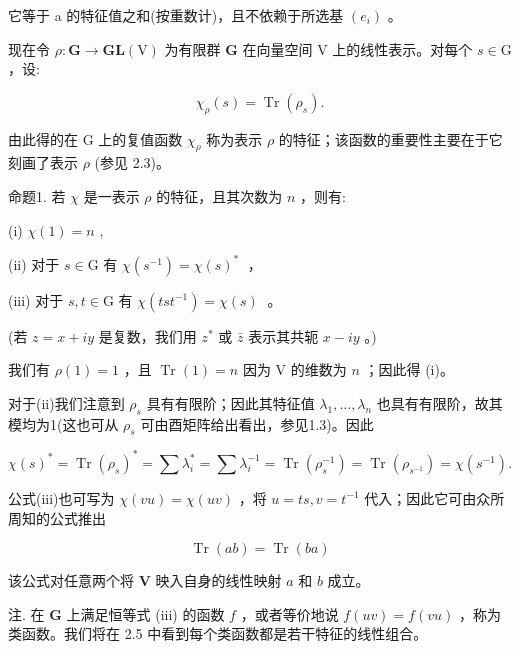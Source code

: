 \documentclass[10pt]{article}
\begin{document}
它等于 a 的特征值之和(按重数计)，且不依赖于所选基 \(\left( {e}_{i}\right)\) 。

现在令 \(\rho  : \mathbf{G} \rightarrow  \mathbf{{GL}}\left( \mathrm{V}\right)\) 为有限群 \(\mathbf{G}\) 在向量空间 \(\mathrm{V}\) 上的线性表示。对每个 \(s \in  \mathrm{G}\) ，设:

\[
{\chi }_{\rho }\left( s\right)  = \operatorname{Tr}\left( {\rho }_{s}\right) .
\]

由此得的在 \(\mathrm{G}\) 上的复值函数 \({\chi }_{\rho }\) 称为表示 \(\rho\) 的特征；该函数的重要性主要在于它刻画了表示 \(\rho\) (参见 2.3)。

命题1. 若 \(\chi\) 是一表示 \(\rho\) 的特征，且其次数为 \(n\) ，则有:

(i) \(\chi \left( 1\right)  = n\) ,

(ii) 对于 \(s \in  \mathrm{G}\) 有 \(\chi \left( {s}^{-1}\right)  = \chi {\left( s\right) }^{ * }\;\) ，

(iii) 对于 \(s,t \in  \mathrm{G}\) 有 \(\chi \left( {{ts}{t}^{-1}}\right)  = \chi \left( s\right) \;\) 。

(若 \(z = x + {iy}\) 是复数，我们用 \({z}^{ * }\) 或 \(\bar{z}\) 表示其共轭 \(x - {iy}\) 。)

我们有 \(\rho \left( 1\right)  = 1\) ，且 \(\operatorname{Tr}\left( 1\right)  = n\) 因为 \(\mathrm{V}\) 的维数为 \(n\) ；因此得 (i)。

对于(ii)我们注意到 \({\rho }_{s}\) 具有有限阶；因此其特征值 \({\lambda }_{1},\ldots ,{\lambda }_{n}\) 也具有有限阶，故其模均为1(这也可从 \({\rho }_{s}\) 可由酉矩阵给出看出，参见1.3)。因此

\[
\chi {\left( s\right) }^{ * } = \operatorname{Tr}{\left( {\rho }_{s}\right) }^{ * } = \sum {\lambda }_{i}^{ * } = \sum {\lambda }_{i}^{-1} = \operatorname{Tr}\left( {\rho }_{s}^{-1}\right)  = \operatorname{Tr}\left( {\rho }_{{s}^{-1}}\right)  = \chi \left( {s}^{-1}\right) .
\]

公式(iii)也可写为 \(\chi \left( {vu}\right)  = \chi \left( {uv}\right)\) ，将 \(u = {ts},v = {t}^{-1}\) 代入；因此它可由众所周知的公式推出

\[
\operatorname{Tr}\left( {ab}\right)  = \operatorname{Tr}\left( {ba}\right)
\]

该公式对任意两个将 \(\mathbf{V}\) 映入自身的线性映射 \(a\) 和 \(b\) 成立。

注. 在 \(\mathbf{G}\) 上满足恒等式 (iii) 的函数 \(f\) ，或者等价地说 \(f\left( {uv}\right)  = f\left( {vu}\right)\) ，称为类函数。我们将在 2.5 中看到每个类函数都是若干特征的线性组合。
\end{document}
